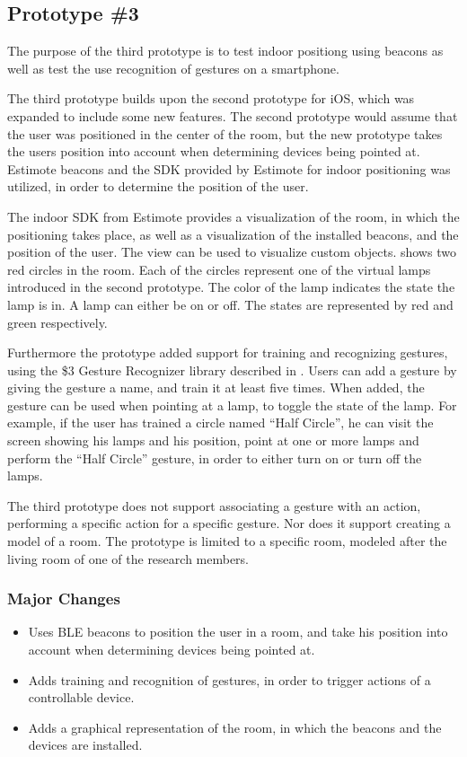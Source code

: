 \subsection{Prototype \#3}
\label{sec:implementation:prototypes:prototype3}

The purpose of the third prototype is to test indoor positiong using beacons as well as test the use recognition of gestures on a smartphone.

The third prototype builds upon the second prototype for iOS, 
which was expanded to include some new features. 
The second prototype would assume that the user was positioned in the center of the room, 
but the new prototype takes the users position into account when determining devices being pointed at. 
Estimote beacons and the SDK provided by Estimote for indoor positioning was utilized, 
in order to determine the position of the user.

The indoor SDK from Estimote provides a visualization of the room, 
in which the positioning takes place, 
as well as a visualization of the installed beacons, 
and the position of the user. 
The view can be used to visualize custom objects. 
 shows two red circles in the room. 
Each of the circles represent one of the virtual lamps introduced in the second prototype. 
The color of the lamp indicates the state the lamp is in. 
A lamp can either be on or off. 
The states are represented by red and green respectively.

Furthermore the prototype added support for training and recognizing gestures, 
using the \$3 Gesture Recognizer library described in .
Users can add a gesture by giving the gesture a name, 
and train it at least five times. 
When added, the gesture can be used when pointing at a lamp, 
to toggle the state of the lamp. 
For example, if the user has trained a circle named ``Half Circle'', 
he can visit the screen showing his lamps and his position, 
point at one or more lamps and perform the ``Half Circle'' gesture, 
in order to either turn on or turn off the lamps.

The third prototype does not support associating a gesture with an action, 
\ie performing a specific action for a specific gesture. 
Nor does it support creating a model of a room. 
The prototype is limited to a specific room, 
modeled after the living room of one of the research members.

\subsubsection{Major Changes}
\begin{itemize}
\item Uses BLE beacons to position the user in a room, and take his position into account when determining devices being pointed at.
\item Adds training and recognition of gestures, in order to trigger actions of a controllable device.
\item Adds a graphical representation of the room, in which the beacons and the devices are installed.
\end{itemize}

